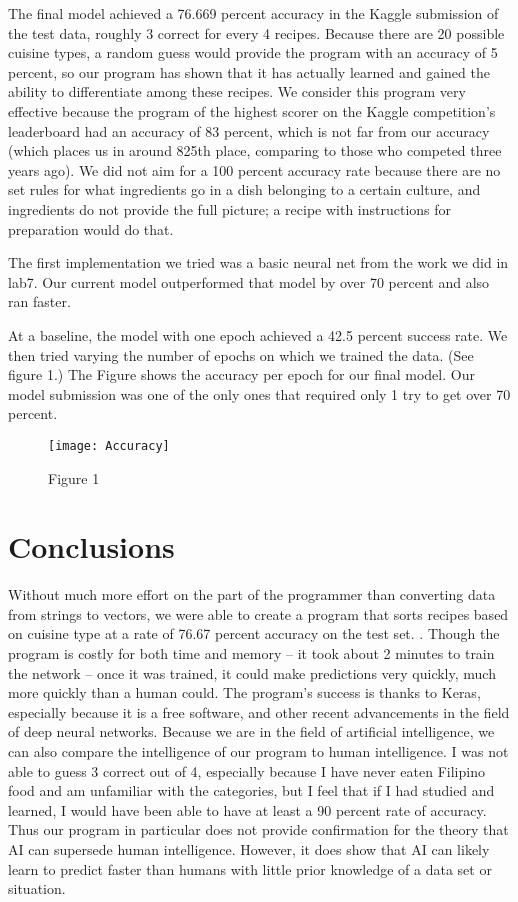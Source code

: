 \documentclass[11pt]{article}
\begin{document}
The final model achieved a 76.669 percent accuracy in the Kaggle submission of the test data, roughly 3 correct for every 4 recipes. Because there are 20 possible cuisine types, a random guess would provide the program with an accuracy of 5 percent, so our program has shown that it has actually learned and gained the ability to differentiate among these recipes. We consider this program very effective because the program of the highest scorer on the Kaggle competition's leaderboard had an accuracy of 83 percent, which is not far from our accuracy (which places us in around 825th place, comparing to those who competed three years ago). We did not aim for a 100 percent accuracy rate because there are no set rules for what ingredients go in a dish belonging to a certain culture, and ingredients do not provide the full picture; a recipe with instructions for preparation would do that. 

The first implementation we tried was a basic neural net from the work we did in lab7. Our current model outperformed that model by over 70 percent and also ran faster. 

At a baseline, the model with one epoch achieved a 42.5 percent success rate. We then tried varying the number of epochs on which we trained the data. (See figure 1.) The Figure shows the accuracy per epoch for our final model.
Our model submission was one of the only ones that required only 1 try to get over 70 percent. 



\begin{figure}[t]
\caption{Figure 1}
\texttt{[image: Accuracy]}
\centering
\end{figure}

\section{Conclusions}

Without much more effort on the part of the programmer than converting data from strings to vectors, we were able to create a program that sorts recipes based on cuisine type at a rate of 76.67 percent accuracy on the test set. . Though the program is costly for both time and memory -- it took about 2 minutes to train the network -- once it was trained, it could make predictions very quickly, much more quickly than a human could. The program's success is thanks to Keras, especially because it is a free software, and other recent advancements in the field of deep neural networks. Because we are in the field of artificial intelligence, we can also compare the intelligence of our program to human intelligence. I was not able to guess 3 correct out of 4, especially because I have never eaten Filipino food and am unfamiliar with the categories, but I feel that if I had studied and learned, I would have been able to have at least a 90 percent rate of accuracy. Thus our program in particular does not provide confirmation for the theory that AI can supersede human intelligence. However, it does show that AI can likely learn to predict faster than humans with little prior knowledge of a data set or situation. 
\end{document}
